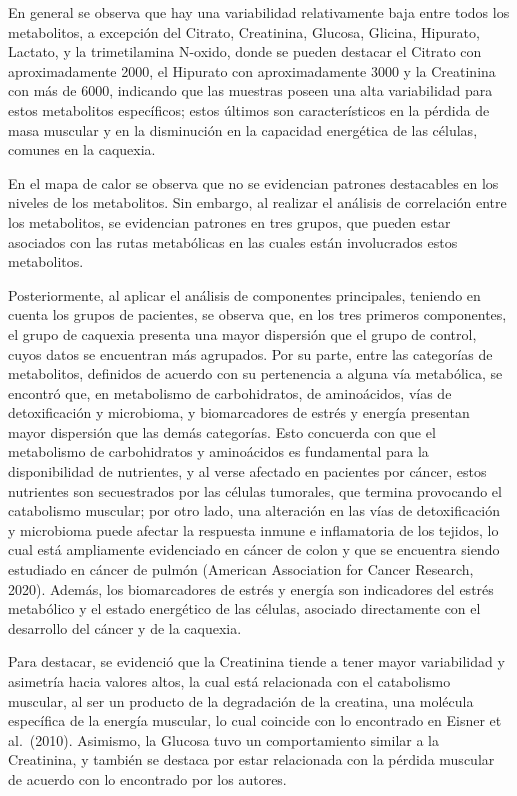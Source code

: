 \documentclass[
]{article}
\begin{document}
En general se observa que hay una variabilidad relativamente baja entre
todos los metabolitos, a excepción del Citrato, Creatinina, Glucosa,
Glicina, Hipurato, Lactato, y la trimetilamina N-oxido, donde se pueden
destacar el Citrato con aproximadamente 2000, el Hipurato con
aproximadamente 3000 y la Creatinina con más de 6000, indicando que las
muestras poseen una alta variabilidad para estos metabolitos
específicos; estos últimos son característicos en la pérdida de masa
muscular y en la disminución en la capacidad energética de las células,
comunes en la caquexia.

En el mapa de calor se observa que no se evidencian patrones destacables
en los niveles de los metabolitos. Sin embargo, al realizar el análisis
de correlación entre los metabolitos, se evidencian patrones en tres
grupos, que pueden estar asociados con las rutas metabólicas en las
cuales están involucrados estos metabolitos.

Posteriormente, al aplicar el análisis de componentes principales,
teniendo en cuenta los grupos de pacientes, se observa que, en los tres
primeros componentes, el grupo de caquexia presenta una mayor dispersión
que el grupo de control, cuyos datos se encuentran más agrupados. Por su
parte, entre las categorías de metabolitos, definidos de acuerdo con su
pertenencia a alguna vía metabólica, se encontró que, en metabolismo de
carbohidratos, de aminoácidos, vías de detoxificación y microbioma, y
biomarcadores de estrés y energía presentan mayor dispersión que las
demás categorías. Esto concuerda con que el metabolismo de carbohidratos
y aminoácidos es fundamental para la disponibilidad de nutrientes, y al
verse afectado en pacientes por cáncer, estos nutrientes son
secuestrados por las células tumorales, que termina provocando el
catabolismo muscular; por otro lado, una alteración en las vías de
detoxificación y microbioma puede afectar la respuesta inmune e
inflamatoria de los tejidos, lo cual está ampliamente evidenciado en
cáncer de colon y que se encuentra siendo estudiado en cáncer de pulmón
(American Association for Cancer Research, 2020). Además, los
biomarcadores de estrés y energía son indicadores del estrés metabólico
y el estado energético de las células, asociado directamente con el
desarrollo del cáncer y de la caquexia.

Para destacar, se evidenció que la Creatinina tiende a tener mayor
variabilidad y asimetría hacia valores altos, la cual está relacionada
con el catabolismo muscular, al ser un producto de la degradación de la
creatina, una molécula específica de la energía muscular, lo cual
coincide con lo encontrado en Eisner et al.~(2010). Asimismo, la Glucosa
tuvo un comportamiento similar a la Creatinina, y también se destaca por
estar relacionada con la pérdida muscular de acuerdo con lo encontrado
por los autores.
\end{document}
